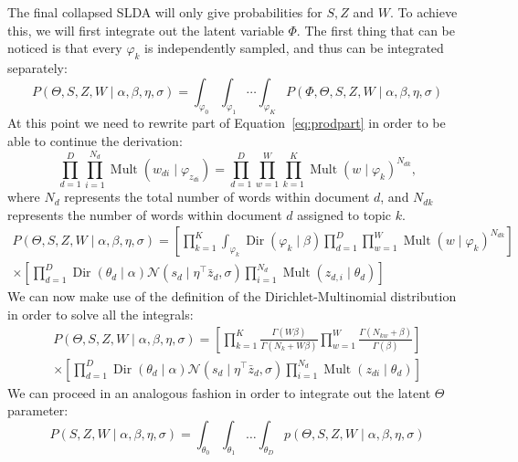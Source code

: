 \documentclass[a4paper,10pt]{article}
\DeclareMathOperator{\Dir}{Dir}
\DeclareMathOperator{\Mult}{Mult}
\renewcommand{\phi}{\varphi}
\begin{document}
The final collapsed SLDA will only give probabilities for \(S, Z\) and \(W\). 
To achieve this, we will first integrate out the latent variable $\Phi$. The first thing that can be noticed is that every $\varphi_k$ is independently sampled, and thus can be integrated separately:
\begin{equation}
P(\Theta, S, Z, W \mid \alpha, \beta, \eta, \sigma) = \int_{\phi_0}\int_{\phi_1}\cdots \int_{\phi_K} P(\Phi, \Theta, S, Z, W \mid \alpha, \beta, \eta, \sigma)
\end{equation}
At this point we need to rewrite part of Equation~\ref{eq:prodpart} in order to be able to continue the derivation:
\begin{equation}
\prod_{d = 1}^D \prod_{i = 1}^{N_d} \Mult(w_{di} \mid \phi_{z_{di}}) = \prod_{d = 1}^D \prod_{w = 1}^W \prod_{k = 1}^K \Mult(w \mid \phi_k)^{N_{dk}},
\end{equation}
where $N_d$ represents the total number of words within document $d$, and $N_{dk}$ represents the number of words within document $d$ assigned to topic $k$.
\begin{equation}
\begin{gathered}
P(\Theta, S, Z, W \mid \alpha, \beta, \eta, \sigma) = \left[ \prod_{k = 1}^K \int_{\phi_k} \Dir(\phi_k \mid \beta) \prod_{d = 1}^D \prod_{w = 1}^W \Mult(w \mid \phi_k)^{N_{dk}} \right]  \\
\times\left[ \prod_{d = 1}^D \Dir(\theta_d \mid \alpha) \mathcal{N}(s_d \mid \eta^\top \bar{z}_d, \sigma) \prod_{i = 1}^{N_d} \Mult(z_{d, i} \mid \theta_d) \right]
\end{gathered}
\end{equation}
We can now make use of the definition of the Dirichlet-Multinomial distribution in order to solve all the integrals:
\begin{equation}
\begin{gathered}
P(\Theta, S, Z, W \mid \alpha, \beta, \eta, \sigma) = \left[ \prod_{k = 1}^K \frac{ \Gamma(W\beta)}{\Gamma(N_k + W\beta)} \prod_{w = 1}^W \frac{\Gamma(N_{kw}+\beta)}{\Gamma(\beta)}\right]\\
\times\left[ \prod_{d = 1}^D \Dir(\theta_d \mid \alpha) \mathcal{N}(s_d \mid \eta^\top \bar{z}_d, \sigma) \prod_{i = 1}^{N_d} \Mult(z_{di} \mid \theta_d) \right]
\end{gathered}
\end{equation}
We can proceed in an analogous fashion in order to integrate out the latent $\Theta$ parameter:
\begin{equation}
P(S, Z, W \mid \alpha, \beta, \eta, \sigma) = \int_{\theta_0}\int_{\theta_1}\dots \int_{\theta_D} p(\Theta, S, Z, W \mid \alpha, \beta, \eta, \sigma)
\end{equation}
\end{document}
